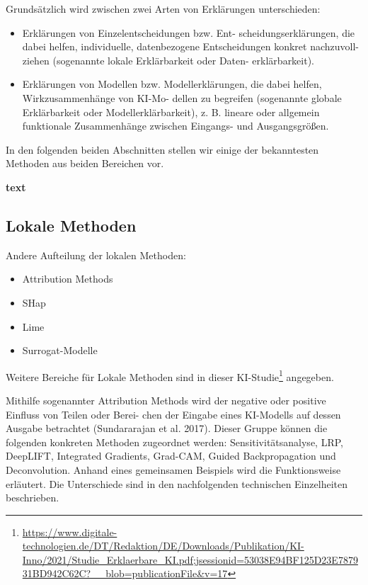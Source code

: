 \documentclass[11pt,a4paper]{article}
\numberwithin{equation}{section}
\begin{document}
	Grundsätzlich wird zwischen zwei Arten von Erklärungen unterschieden:
	
	\begin{itemize}
		\item Erklärungen von Einzelentscheidungen bzw. Ent-
		scheidungserklärungen, die dabei helfen, individuelle,
		datenbezogene Entscheidungen konkret nachzuvoll-
		ziehen (sogenannte lokale Erklärbarkeit oder Daten-
		erklärbarkeit).
		\item Erklärungen von Modellen bzw. Modellerklärungen,
		die dabei helfen, Wirkzusammenhänge von KI-Mo-
		dellen zu begreifen (sogenannte globale Erklärbarkeit
		oder Modellerklärbarkeit), z. B. lineare oder allgemein
		funktionale Zusammenhänge zwischen Eingangs-
		und Ausgangsgrößen.
	\end{itemize}

In den folgenden beiden Abschnitten stellen wir einige der bekanntesten Methoden aus beiden Bereichen vor.


	\noindent \textbf{text}
	\subsection{Lokale Methoden}
	
	Andere Aufteilung der lokalen Methoden:
	\begin{itemize}
		\item Attribution Methods
		\item SHap
		\item Lime
		\item Surrogat-Modelle	
	\end{itemize}
	
	Weitere Bereiche für Lokale Methoden sind in dieser KI-Studie\footnote{\url{https://www.digitale-technologien.de/DT/Redaktion/DE/Downloads/Publikation/KI-Inno/2021/Studie_Erklaerbare_KI.pdf;jsessionid=53038E94BF125D23E787931BD942C62C?__blob=publicationFile\&v=17}} angegeben.
	
	Mithilfe sogenannter Attribution Methods wird der
	negative oder positive Einfluss von Teilen oder Berei-
	chen der Eingabe eines KI-Modells auf dessen Ausgabe
	betrachtet (Sundararajan et al. 2017). Dieser Gruppe
	können die folgenden konkreten Methoden zugeordnet
	werden: Sensitivitätsanalyse, LRP, DeepLIFT, Integrated
	Gradients, Grad-CAM, Guided Backpropagation und
	Deconvolution. Anhand eines gemeinsamen Beispiels
	wird die Funktionsweise erläutert. Die Unterschiede
	sind in den nachfolgenden technischen Einzelheiten
	beschrieben.
	
\end{document}
